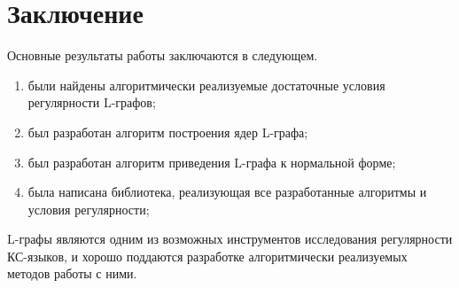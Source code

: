\chapter*{Заключение}						%

Основные результаты работы заключаются в следующем.
\begin{enumerate}
  \item были найдены алгоритмически реализуемые достаточные условия регулярности L-графов;
  \item был разработан алгоритм построения ядер L-графа;
  \item был разработан алгоритм приведения L-графа к нормальной форме;
  \item была написана библиотека, реализующая все разработанные алгоритмы и условия регулярности;
\end{enumerate}
L-графы являются одним из возможных инструментов исследования регулярности КС-языков, 
и хорошо поддаются разработке алгоритмически реализуемых методов работы с ними.
\clearpage